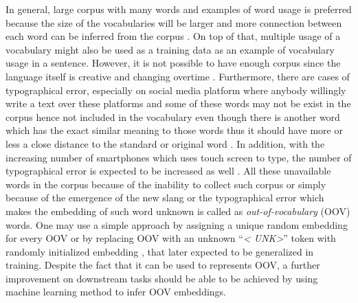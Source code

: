     In general, large corpus with many words and examples of word
    usage is preferred because the size of the vocabularies will be
    larger and more connection between each word can be inferred from
    the corpus \citep{size2018kutuzov}. On top of that, multiple usage
    of a vocabulary might also be used as a training data as an example
    of vocabulary usage in a sentence. However, it is not possible to
    have enough corpus since the language itself is creative and
    changing overtime \citep{forrester2008abrief,
    speech2009Jurafsky:2009:SLP:1214993}. Furthermore, there are cases
    of typographical error, especially on social media platform where
    anybody willingly write a text over these platforms
    \citep{Liu2010SentimentAA} and some of these words may not be
    exist in the corpus hence not included in the vocabulary even
    though there is another word which has the exact similar meaning to
    those words thus it should have more or less a close distance to the
    standard or original word \citep{mapping2012eisenstein}. In
    addition, with the increasing number of smartphones which uses
    touch screen to type, the number of typographical error is
    expected to be increased as well \citep{ghosh2017correction}. All
    these unavailable words in the corpus because of the inability to
    collect such corpus or simply because of the emergence of the new slang or
    the typographical error which makes the embedding of such word unknown
    is called as \textit{out-of-vocabulary} (OOV) words. One
    may use a simple approach by assigning a unique random embedding for
    every OOV or by replacing OOV with an unknown ``\textit{\textless
    UNK\textgreater}'' token with randomly initialized embedding
    \citep{predicting2019garneau}, that later expected to be generalized
    in training. Despite the fact that it can be used to represents
    OOV, a further improvement on downstream tasks should be able to be
    achieved by using machine learning method to infer OOV embeddings.

